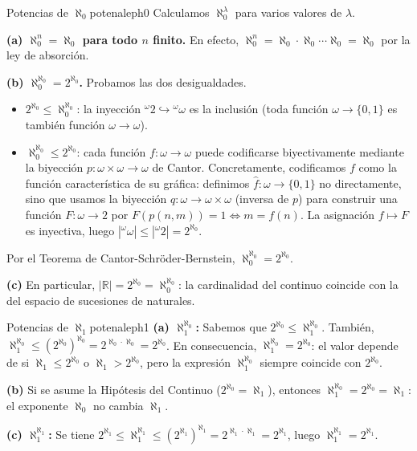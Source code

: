 \begin{ejemplo}{Potencias de $\aleph_0$}{potenaleph0}
Calculamos $\aleph_0^\lambda$ para varios valores de $\lambda$.

\textbf{(a) $\aleph_0^n = \aleph_0$ para todo $n$ finito.} En efecto, $\aleph_0^n = \aleph_0 \cdot \aleph_0 \cdots \aleph_0 = \aleph_0$ por la ley de absorción.

\textbf{(b) $\aleph_0^{\aleph_0} = 2^{\aleph_0}$.} Probamos las dos desigualdades.
\begin{itemize}[leftmargin=2em]
  \item $2^{\aleph_0} \leq \aleph_0^{\aleph_0}$: la inyección ${}^\omega 2 \hookrightarrow {}^\omega \omega$ es la inclusión (toda función $\omega \to \{0,1\}$ es también función $\omega \to \omega$).
  \item $\aleph_0^{\aleph_0} \leq 2^{\aleph_0}$: cada función $f \colon \omega \to \omega$ puede codificarse biyectivamente mediante la biyección $p \colon \omega \times \omega \to \omega$ de Cantor. Concretamente, codificamos $f$ como la función característica de su gráfica: definimos $\hat{f} \colon \omega \to \{0,1\}$ no directamente, sino que usamos la biyección $q \colon \omega \to \omega \times \omega$ (inversa de $p$) para construir una función $F \colon \omega \to 2$ por $F(p(n,m)) = 1 \iff m = f(n)$. La asignación $f \mapsto F$ es inyectiva, luego $|{}^\omega\omega| \leq |{}^\omega 2| = 2^{\aleph_0}$.
\end{itemize}
Por el Teorema de Cantor-Schröder-Bernstein, $\aleph_0^{\aleph_0} = 2^{\aleph_0}$.

\textbf{(c)} En particular, $|\mathbb{R}| = 2^{\aleph_0} = \aleph_0^{\aleph_0}$: la cardinalidad del continuo coincide con la del espacio de sucesiones de naturales.
\end{ejemplo}

\begin{ejemplo}{Potencias de $\aleph_1$}{potenaleph1}
\textbf{(a) $\aleph_1^{\aleph_0}$:} Sabemos que $2^{\aleph_0} \leq \aleph_1^{\aleph_0}$. También, $\aleph_1^{\aleph_0} \leq (2^{\aleph_0})^{\aleph_0} = 2^{\aleph_0 \cdot \aleph_0} = 2^{\aleph_0}$. En consecuencia, $\aleph_1^{\aleph_0} = 2^{\aleph_0}$: el valor depende de si $\aleph_1 \leq 2^{\aleph_0}$ o $\aleph_1 > 2^{\aleph_0}$, pero la expresión $\aleph_1^{\aleph_0}$ siempre coincide con $2^{\aleph_0}$.

\textbf{(b)} Si se asume la Hipótesis del Continuo ($2^{\aleph_0} = \aleph_1$), entonces $\aleph_1^{\aleph_0} = 2^{\aleph_0} = \aleph_1$: el exponente $\aleph_0$ no cambia $\aleph_1$.

\textbf{(c) $\aleph_1^{\aleph_1}$:} Se tiene $2^{\aleph_1} \leq \aleph_1^{\aleph_1} \leq (2^{\aleph_1})^{\aleph_1} = 2^{\aleph_1 \cdot \aleph_1} = 2^{\aleph_1}$, luego $\aleph_1^{\aleph_1} = 2^{\aleph_1}$.
\end{ejemplo}

